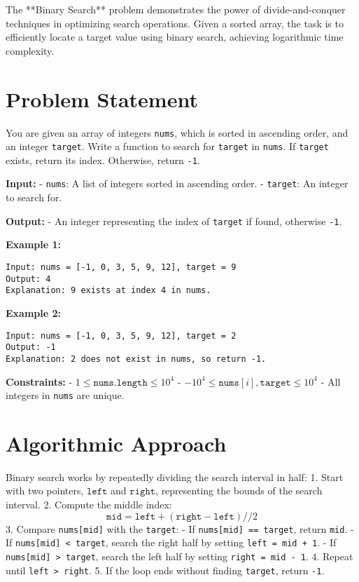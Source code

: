 
\label{problem:Binary_Search}

The **Binary Search** problem demonstrates the power of divide-and-conquer techniques in optimizing search operations. Given a sorted array, the task is to efficiently locate a target value using binary search, achieving logarithmic time complexity.

\section*{Problem Statement}
You are given an array of integers \texttt{nums}, which is sorted in ascending order, and an integer \texttt{target}. Write a function to search for \texttt{target} in \texttt{nums}. If \texttt{target} exists, return its index. Otherwise, return \texttt{-1}.

\textbf{Input:}
- \texttt{nums}: A list of integers sorted in ascending order.
- \texttt{target}: An integer to search for.

\textbf{Output:}
- An integer representing the index of \texttt{target} if found, otherwise \texttt{-1}.

\textbf{Example 1:}
\begin{verbatim}
Input: nums = [-1, 0, 3, 5, 9, 12], target = 9
Output: 4
Explanation: 9 exists at index 4 in nums.
\end{verbatim}

\textbf{Example 2:}
\begin{verbatim}
Input: nums = [-1, 0, 3, 5, 9, 12], target = 2
Output: -1
Explanation: 2 does not exist in nums, so return -1.
\end{verbatim}

\textbf{Constraints:}
- \( 1 \leq \texttt{nums.length} \leq 10^4 \)
- \( -10^4 \leq \texttt{nums}[i], \texttt{target} \leq 10^4 \)
- All integers in \texttt{nums} are unique.

\section*{Algorithmic Approach}
Binary search works by repeatedly dividing the search interval in half:
1. Start with two pointers, \( \texttt{left} \) and \( \texttt{right} \), representing the bounds of the search interval.
2. Compute the middle index:
   \[
   \texttt{mid} = \texttt{left} + (\texttt{right} - \texttt{left}) // 2
   \]
3. Compare \texttt{nums[mid]} with the \texttt{target}:
   - If \texttt{nums[mid] == target}, return \texttt{mid}.
   - If \texttt{nums[mid] < target}, search the right half by setting \texttt{left = mid + 1}.
   - If \texttt{nums[mid] > target}, search the left half by setting \texttt{right = mid - 1}.
4. Repeat until \texttt{left > right}.
5. If the loop ends without finding \texttt{target}, return \texttt{-1}.

